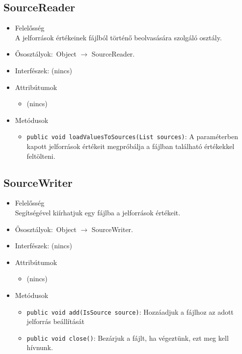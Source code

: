 \subsection{SourceReader}
\begin{itemize}
\item Felelősség\\
A jelforrások értékeinek fájlból történő beolvasására szolgáló osztály.
\item Ősosztályok:\ Object $\rightarrow{}$ SourceReader.
\item Interfészek: (nincs)
\item Attribútumok $\ $
\begin{itemize}
\item (nincs)
\end{itemize}
\item Metódusok$\ $
\begin{itemize}
	\item \texttt{public void loadValuesToSources(List sources)}: A paraméterben kapott jelforrások értékeit megpróbálja a fájlban  található értékekkel feltölteni.
\end{itemize}
\end{itemize}

\subsection{SourceWriter}
\begin{itemize}
\item Felelősség\\
Segítségével kiírhatjuk egy fájlba a jelforrások értékeit.
\item Ősosztályok:\ Object $\rightarrow{}$ SourceWriter.
\item Interfészek: (nincs)
\item Attribútumok $\ $
\begin{itemize}
\item (nincs)
\end{itemize}
\item Metódusok$\ $
\begin{itemize}
	\item \texttt{public void add(IsSource source)}: Hozzáadjuk a fájlhoz az adott jelforrás beállítását
	\item \texttt{public void close()}: Bezárjuk a fájlt, ha végeztünk, ezt meg kell hívnunk.
\end{itemize}
\end{itemize}

